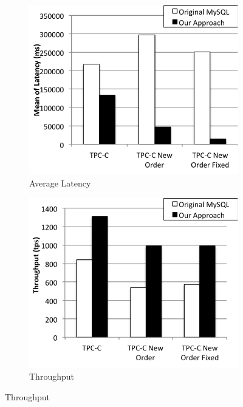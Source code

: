 \begin{figure}
    \centering
    \begin{subfigure}[t]{0.24\textwidth}
        \includegraphics[width=\textwidth]{plots/all/latency}
        \caption{Average Latency}
        \label{fig:all-mean}
    \end{subfigure}
    \begin{subfigure}[t]{0.24\textwidth}
        \includegraphics[width=\textwidth]{plots/all/throughput}
        \caption{Throughput}
        \label{fig:all-throughput}
    \end{subfigure}

\end{figure}
